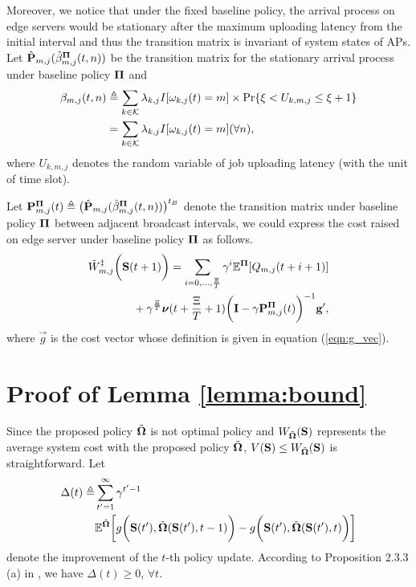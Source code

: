 Moreover, we notice that under the fixed baseline policy, the arrival process on edge servers would be stationary after the maximum uploading latency from the initial interval and thus the transition matrix is invariant of system states of APs.
Let $\hat{\mathbf{P}}_{m,j}(\hat{\beta}^{\boldsymbol{\Pi}}_{m,j}(t,n))$ be the transition matrix for the stationary arrival process under baseline policy $\boldsymbol{\Pi}$ and
{\small
\begin{align}
    \beta_{m,j}(t,n) &\triangleq \sum_{k\in\mathcal{K}} \lambda_{k,j}I[\omega_{k,j}(t)=m] \times \Pr\{ \xi<U_{k,m,j}\le\xi+1 \}
    \nonumber\\
    &= \sum_{k\in\mathcal{K}} \lambda_{k,j}I[\omega_{k,j}(t)=m] (\forall n),
\end{align}
}where $U_{k,m,j}$ denotes the random variable of job uploading latency (with the unit of time slot).

Let
$\mathbf{P}^{\boldsymbol{\Pi}}_{m,j}(t) \triangleq \big( \hat{\mathbf{P}}_{m,j}(\hat{\beta}^{\boldsymbol{\Pi}}_{m,j}(t,n)) \big)^{t_B}$
denote the transition matrix under baseline policy $\boldsymbol{\Pi}$ between adjacent broadcast intervals, we could express the cost raised on edge server under baseline policy $\boldsymbol{\Pi}$ as follows.
{\small
\begin{align}
    &\tilde{W}^{\ddagger}_{m,j}\bigg(\mathbf{S}(t+1)\bigg)
    = \sum_{i=0,\dots,\frac{\Xi}{T}} \gamma^{i} \mathbb{E}^{\boldsymbol{\Pi}}[ Q_{m,j}({t+i+1}) ]
    \nonumber\\
    &~~~~~~~~~~~~+ \gamma^{\frac{\Xi}{T}} 
    \boldsymbol{\nu}({t+\frac{\Xi}{T}+1})
    \bigg(
        \mathbf{I} - \gamma \mathbf{P}^{\boldsymbol{\Pi}}_{m,j}(t)
    \bigg)^{-1} \mathbf{g}',
\end{align}   
}
where $\vec{g}$ is the cost vector whose definition is given in equation (\ref{eqn:g_vec}).

\section{ Proof of Lemma \ref{lemma:bound} }
\label{append_3}
 Since the proposed policy $\tilde{\boldsymbol{\Omega}}$ is not optimal policy and $W_{\tilde{\boldsymbol{\Omega}}}(\mathbf{S})$ represents the average system cost with the proposed policy $\tilde{\boldsymbol{\Omega}}$, $V(\mathbf{S}) \leq W_{\tilde{\boldsymbol{\Omega}}}(\mathbf{S})$ is straightforward.
Let 
{\small
\begin{align*}
    \Delta(t) \triangleq &
    \sum_{t'=1}^{\infty} \gamma^{t'-1}\\\nonumber
    &\mathbb{E}^{ \tilde{\boldsymbol{\Omega}} } \bigg[
        g\bigg(\mathbf{S}(t'), \tilde{\boldsymbol{\Omega}}(\mathbf{S}(t'),t-1)\bigg)
        -  g\bigg(\mathbf{S}(t'), \tilde{\boldsymbol{\Omega}}(\mathbf{S}(t'),t)\bigg)
    \bigg]
\end{align*}
}
denote the improvement of the $t$-th policy update.
According to Proposition 2.3.3 (a) in \cite{dp-control}, we have $\Delta(t)\geq 0$, $\forall t$.

